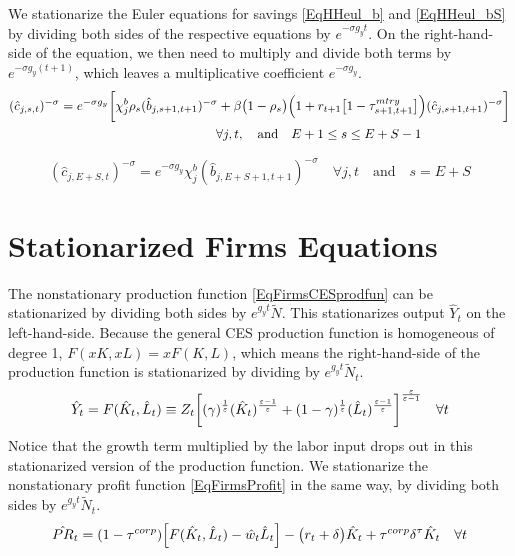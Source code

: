   We stationarize the Euler equations for savings \eqref{EqHHeul_b} and \eqref{EqHHeul_bS} by dividing both sides of the respective equations by $e^{-\sigma g_y t}$. On the right-hand-side of the equation, we then need to multiply and divide both terms by $e^{-\sigma g_y(t+1)}$, which leaves a multiplicative coefficient $e^{-\sigma g_y}$.
  \begin{equation}\label{EqStnrzHHeul_b}
    \begin{split}
      &(\hat{c}_{j,s,t})^{-\sigma} = e^{-\sigma g_y}\biggl[\chi^b_j\rho_s(\hat{b}_{j,s+1,t+1})^{-\sigma} + \beta\bigl(1 - \rho_s\bigr)\Bigl(1 + r_{t+1}\bigl[1 - \tau^{mtry}_{s+1,t+1}\bigr]\Bigr)(\hat{c}_{j,s+1,t+1})^{-\sigma}\biggr] \\
      &\qquad\qquad\qquad\qquad\qquad\qquad\qquad\qquad\forall j,t, \quad\text{and}\quad E+1\leq s\leq E+S-1 \\
    \end{split}
  \end{equation}

  \begin{equation}\label{EqStnrzHHeul_bS}
    (\hat{c}_{j,E+S,t})^{-\sigma} = e^{-\sigma g_y}\chi^b_j(\hat{b}_{j,E+S+1,t+1})^{-\sigma} \quad\forall j,t \quad\text{and}\quad s = E+S
  \end{equation}


\section{Stationarized Firms Equations}\label{SecStnrzFirms}

  The nonstationary production function \eqref{EqFirmsCESprodfun} can be stationarized by dividing both sides by $e^{g_y t}\tilde{N}$. This stationarizes output $\hat{Y}_t$ on the left-hand-side. Because the general CES production function is homogeneous of degree 1, $F(xK,xL) = xF(K,L)$, which means the right-hand-side of the production function is stationarized by dividing by $e^{g_y t}\tilde{N}_t$.
  \begin{equation}\label{EqStnrzCESprodfun}
    \hat{Y}_t = F(\hat{K}_t, \hat{L}_t) \equiv Z_t\biggl[(\gamma)^\frac{1}{\varepsilon}(\hat{K}_t)^\frac{\varepsilon-1}{\varepsilon} + (1-\gamma)^\frac{1}{\varepsilon}(\hat{L}_t)^\frac{\varepsilon-1}{\varepsilon}\biggr]^\frac{\varepsilon}{\varepsilon-1} \quad\forall t
  \end{equation}
  Notice that the growth term multiplied by the labor input drops out in this stationarized version of the production function. We stationarize the nonstationary profit function \eqref{EqFirmsProfit} in the same way, by dividing both sides by $e^{g_y t}\tilde{N}_t$.
  \begin{equation}\label{EqStnrzProfit}
    \hat{PR}_t = (1 - \tau^{corp})\Bigl[F(\hat{K}_t,\hat{L}_t) - \hat{w}_t \hat{L}_t\Bigr] - \bigl(r_t + \delta\bigr)\hat{K}_t + \tau^{corp}\delta^\tau \hat{K}_t \quad\forall t
  \end{equation}

